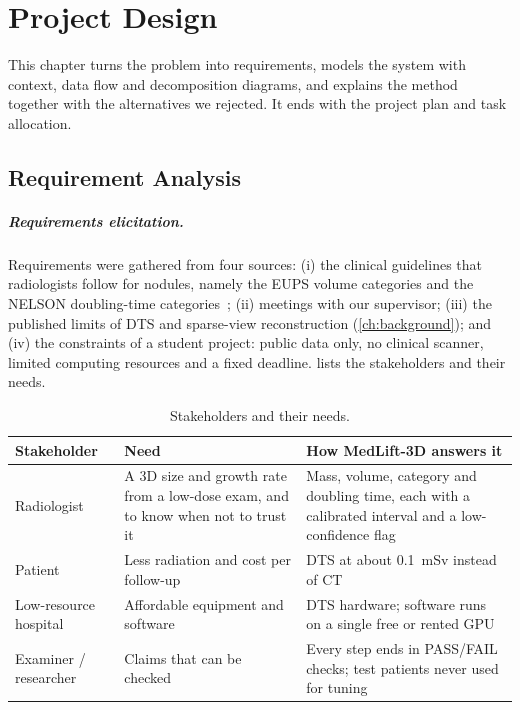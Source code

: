 \chapter{Project Design}
\label{ch:design}

This chapter turns the problem into requirements, models the system with context, data flow and decomposition diagrams, and explains the method together with the alternatives we rejected. It ends with the project plan and task allocation.

\section{Requirement Analysis}

\paragraph{Requirements elicitation.} Requirements were gathered from four sources: (i) the clinical guidelines that radiologists follow for nodules, namely the EUPS volume categories and the NELSON doubling-time categories~\cite{oudkerk2017eups,horeweg2014nelson}; (ii) meetings with our supervisor; (iii) the published limits of DTS and sparse-view reconstruction (\cref{ch:background}); and (iv) the constraints of a student project: public data only, no clinical scanner, limited computing resources and a fixed deadline.  lists the stakeholders and their needs.

\begin{table}[!htbp]
\centering\small
\caption{Stakeholders and their needs.}
\label{tab:stakeholders}
\begin{tabularx}{\linewidth}{>{\raggedright\arraybackslash}p{2.8cm} >{\raggedright\arraybackslash}X >{\raggedright\arraybackslash}X}
\toprule
Stakeholder & Need & How MedLift-3D answers it \\
\midrule
Radiologist & A 3D size and growth rate from a low-dose exam, and to know when not to trust it & Mass, volume, category and doubling time, each with a calibrated interval and a low-confidence flag \\
Patient & Less radiation and cost per follow-up & DTS at about 0.1~mSv instead of CT \\
Low-resource hospital & Affordable equipment and software & DTS hardware; software runs on a single free or rented GPU \\
Examiner / researcher & Claims that can be checked & Every step ends in PASS/FAIL checks; test patients never used for tuning \\
\bottomrule
\end{tabularx}
\end{table}


